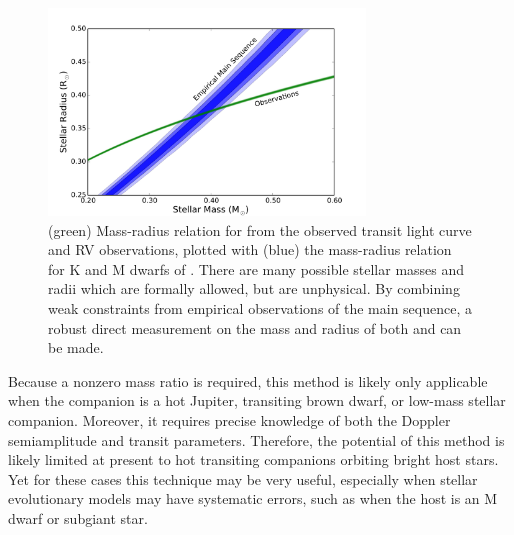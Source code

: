 \begin{figure}[htbp]
\centerline{\includegraphics[width=0.75\textwidth]{chapter4/f8.pdf}}
\caption[Allowed mass-radius relation for LHS\,6343\,A from observations compared to the main-sequence]{(green) Mass-radius relation for \LA{} from the observed transit light curve and RV observations, plotted with (blue) the mass-radius relation for K and M dwarfs of \citet{Boyajian12}. There are many possible stellar masses and radii which are formally allowed, but are unphysical. By combining weak constraints from empirical observations of the main sequence, a robust direct measurement on the mass and radius of both \LA{} and \LC{} can be made.
}
\label{M-R}
\end{figure}


Because a nonzero mass ratio is required, this method is likely only applicable when the companion is a hot Jupiter, transiting brown dwarf, or low-mass stellar companion.
Moreover, it requires precise knowledge of both the Doppler semiamplitude and transit parameters. 
Therefore, the potential of this method is likely limited at present to hot transiting companions orbiting bright host stars.
Yet for these cases this technique may be very useful, especially when stellar evolutionary models may have systematic errors, such as when the host is an M dwarf or subgiant star.





